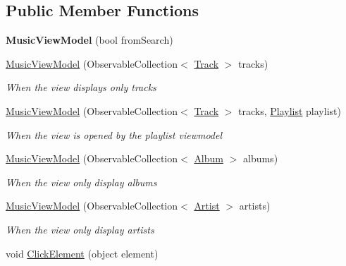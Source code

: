 \subsection*{Public Member Functions}
\begin{DoxyCompactItemize}
\item 
\mbox{\label{class_presentation_1_1_view_model_1_1_music_view_model_a663da1779b44dad9622f6e87d335d1e5}} 
{\bfseries Music\+View\+Model} (bool from\+Search)
\item 
\hyperlink{class_presentation_1_1_view_model_1_1_music_view_model_a2d9bfd47e3a2e98ac08cdfec449d69bf}{Music\+View\+Model} (Observable\+Collection$<$ \hyperlink{class_d_t_o_1_1_entity_1_1_track}{Track} $>$ tracks)
\begin{DoxyCompactList}\small\item\em When the view displays only tracks \end{DoxyCompactList}\item 
\hyperlink{class_presentation_1_1_view_model_1_1_music_view_model_a8230a35d252df28e6578be32bf6f8ba2}{Music\+View\+Model} (Observable\+Collection$<$ \hyperlink{class_d_t_o_1_1_entity_1_1_track}{Track} $>$ tracks, \hyperlink{class_d_t_o_1_1_entity_1_1_playlist}{Playlist} playlist)
\begin{DoxyCompactList}\small\item\em When the view is opened by the playlist viewmodel \end{DoxyCompactList}\item 
\hyperlink{class_presentation_1_1_view_model_1_1_music_view_model_a5856bb1decf95ae383427219e6598706}{Music\+View\+Model} (Observable\+Collection$<$ \hyperlink{class_d_t_o_1_1_entity_1_1_album}{Album} $>$ albums)
\begin{DoxyCompactList}\small\item\em When the view only display albums \end{DoxyCompactList}\item 
\hyperlink{class_presentation_1_1_view_model_1_1_music_view_model_a0b884bbf52c755226eac57a6b68a4e41}{Music\+View\+Model} (Observable\+Collection$<$ \hyperlink{class_d_t_o_1_1_entity_1_1_artist}{Artist} $>$ artists)
\begin{DoxyCompactList}\small\item\em When the view only display artists \end{DoxyCompactList}\item 
void \hyperlink{class_presentation_1_1_view_model_1_1_music_view_model_a5fc99c4453a0bb82e1b53091fa31b554}{Click\+Element} (object element)

\end{DoxyCompactItemize}
